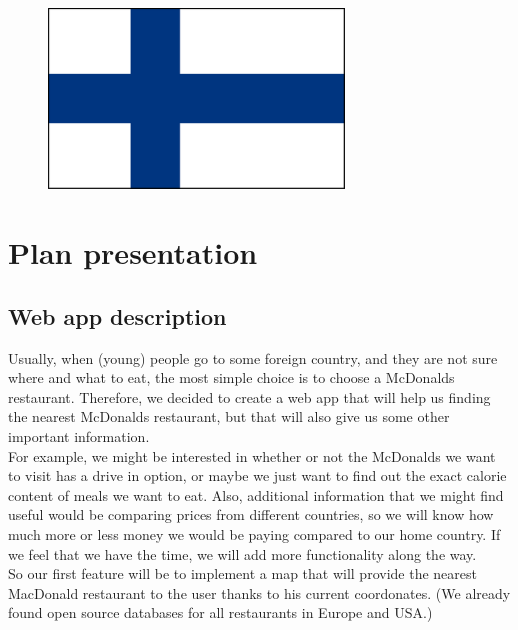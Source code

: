 \documentclass[12pt]{article}
\begin{document}
\begin{figure} [h!]
\begin{minipage}[c]{0.24\linewidth}
                \includegraphics[width=0.7\textwidth]{./Pictures/finnish.png}
            \end{minipage}
        \end{figure}

        \vspace{-1em}

    {\color{color_section}\section{Plan presentation}}
        {\color{color_subsection}\subsection{Web app description}}
        
        Usually, when (young) people go to some foreign country, and they
        are not sure where and what to eat, the most simple choice is to
        choose a McDonalds restaurant. Therefore, we decided to create a web 
        app that will help us finding the nearest McDonalds restaurant, 
        but that will also give us some other important information.\\
        
        \noindent For example, we might be interested in whether or not the McDonalds we want 
        to visit has a drive in option, or maybe we just want to find out 
        the exact calorie content of meals we want to eat. Also, additional 
        information that we might find useful would be comparing prices from 
        different countries, so we will know how much more or less money we would be 
        paying compared to our home country. If we feel that we 
        have the time, we will add more functionality along the way.\\

        \noindent So our first feature will be to implement a map that will provide
        the nearest MacDonald restaurant to the user thanks to his current coordonates.
        (We already found open source databases for all restaurants in Europe and USA.)\\
\end{document}
